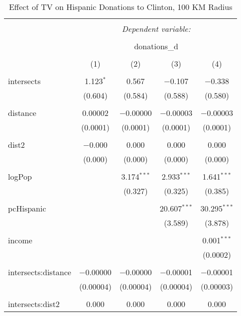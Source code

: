 
\begin{table}[!htbp] \centering 
  \caption{Effect of TV on Hispanic Donations to Clinton, 100 KM Radius} 
  \label{} 
\begin{tabular}{@{\extracolsep{-5pt}}lcccc} 
\\[-1.8ex]\hline 
\hline \\[-1.8ex] 
 & \multicolumn{4}{c}{\textit{Dependent variable:}} \\ 
\cline{2-5} 
\\[-1.8ex] & \multicolumn{4}{c}{donations\_d} \\ 
\\[-1.8ex] & (1) & (2) & (3) & (4)\\ 
\hline \\[-1.8ex] 
 intersects & 1.123$^{*}$ & 0.567 & $-$0.107 & $-$0.338 \\ 
  & (0.604) & (0.584) & (0.588) & (0.580) \\ 
  & & & & \\ 
 distance & 0.00002 & $-$0.00000 & $-$0.00003 & $-$0.00003 \\ 
  & (0.0001) & (0.0001) & (0.0001) & (0.0001) \\ 
  & & & & \\ 
 dist2 & $-$0.000 & 0.000 & 0.000 & 0.000 \\ 
  & (0.000) & (0.000) & (0.000) & (0.000) \\ 
  & & & & \\ 
 logPop &  & 3.174$^{***}$ & 2.933$^{***}$ & 1.641$^{***}$ \\ 
  &  & (0.327) & (0.325) & (0.385) \\ 
  & & & & \\ 
 pcHispanic &  &  & 20.607$^{***}$ & 30.295$^{***}$ \\ 
  &  &  & (3.589) & (3.878) \\ 
  & & & & \\ 
 income &  &  &  & 0.001$^{***}$ \\ 
  &  &  &  & (0.0002) \\ 
  & & & & \\ 
 intersects:distance & $-$0.00000 & $-$0.00000 & $-$0.00001 & $-$0.00001 \\ 
  & (0.00004) & (0.00004) & (0.00004) & (0.00003) \\ 
  & & & & \\ 
 intersects:dist2 & 0.000 & 0.000 & 0.000 & 0.000 \\ 

\end{tabular}
\end{table}
